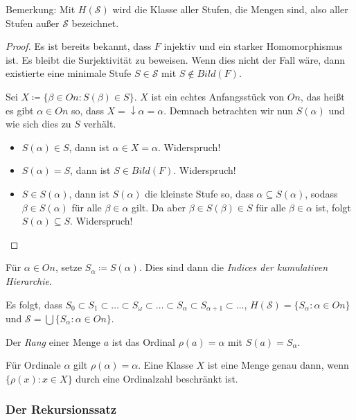 Bemerkung: Mit $H(\mathcal{S})$ wird die Klasse aller Stufen, die Mengen sind, also aller Stufen außer $\mathcal{S}$ bezeichnet.

\begin{proof}
	Es ist bereits bekannt, dass $F$ injektiv und ein starker Homomorphismus ist. Es bleibt die Surjektivität zu beweisen. Wenn dies nicht der Fall wäre, dann existierte eine minimale Stufe $S\in\mathcal{S}$ mit $S\notin Bild(F)$. 
	
	Sei $X\coloneqq\{\beta\in On:S(\beta)\in S\}$. $X$ ist ein echtes Anfangsstück von $On$, das heißt es gibt $\alpha\in On$ so, dass $X=\downarrow \alpha=\alpha$. Demnach betrachten wir nun $S(\alpha)$ und wie sich dies zu $S$ verhält.
	\begin{itemize}
		\item $S(\alpha)\in S$, dann ist $\alpha\in X=\alpha$. Widerspruch!
		\item $S(\alpha)=S$, dann ist $S\in Bild(F)$. Widerspruch!
		\item $S\in S(\alpha)$, dann ist $S(\alpha)$ die kleinste Stufe so, dass $\alpha\subseteq S(\alpha)$, sodass $\beta\in S(\alpha)$ für alle $\beta\in\alpha$ gilt. 
		Da aber $\beta\in S(\beta)\in S$ für alle $\beta\in\alpha$ ist, folgt $S(\alpha)\subseteq S$. Widerspruch!
	\end{itemize}
\end{proof}

\begin{definition}
	Für $\alpha\in On$, setze $S_\alpha\coloneqq S(\alpha)$. Dies sind dann die \textit{Indices der kumulativen Hierarchie}.
\end{definition}

Es folgt, dass $S_0\subset S_1 \subset \dots \subset S_\omega \subset \dots \subset S_\alpha \subset S_{\alpha+1}\subset\dots$, $H(\mathcal{S})=\{S_\alpha:\alpha\in On\}$ und $\mathcal{S}=\bigcup\{S_\alpha : \alpha\in On\}$.

\begin{definition}
	Der \textit{Rang} einer Menge $a$ ist das Ordinal $\rho(a)=\alpha$ mit $S(a)=S_\alpha$.
\end{definition}

Für Ordinale $\alpha$ gilt $\rho(\alpha)=\alpha$. Eine Klasse $X$ ist eine Menge genau dann, wenn $\{\rho(x):x\in X\}$ durch eine Ordinalzahl beschränkt ist.

\subsubsection{Der Rekursionssatz}

